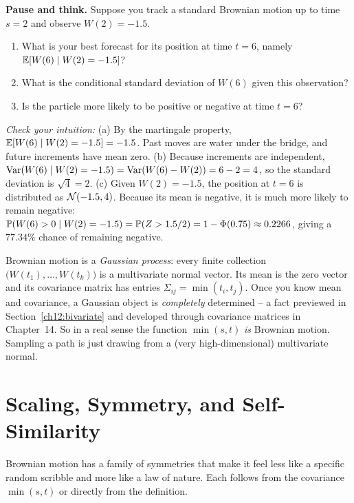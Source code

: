 \begin{recoverybox}
\textbf{Pause and think.} Suppose you track a standard Brownian motion up to time
$s=2$ and observe $W(2) = -1.5$.
\begin{enumerate}[label=(\alph*)]
  \item What is your best forecast for its position at time $t=6$, namely
  $\E[W(6) \mid W(2) = -1.5]$?
  \item What is the conditional standard deviation of $W(6)$ given this observation?
  \item Is the particle more likely to be positive or negative at time $t=6$?
\end{enumerate}
\textit{Check your intuition:}
(a) By the martingale property, $\E[W(6) \mid W(2) = -1.5] = -1.5$. Past moves are
water under the bridge, and future increments have mean zero.
(b) Because increments are independent,
$\Var(W(6) \mid W(2) = -1.5) = \Var(W(6)-W(2)) = 6 - 2 = 4$, so the standard
deviation is $\sqrt{4} = 2$.
(c) Given $W(2) = -1.5$, the position at $t=6$ is distributed as
$\Normal(-1.5, 4)$. Because its mean is negative, it is much more likely to remain
negative: $\P(W(6) > 0 \mid W(2)=-1.5) = \P(Z > 1.5/2) = 1 - \Phi(0.75) \approx 0.2266$,
giving a $77.34\%$ chance of remaining negative.
\end{recoverybox}

\begin{connectionbox}
Brownian motion is a \emph{Gaussian process}: every finite collection
$\big(W(t_1),\dots,W(t_k)\big)$ is a multivariate normal vector. Its mean is the
zero vector and its covariance matrix has entries $\Sigma_{ij}=\min(t_i,t_j)$.
Once you know mean and covariance, a Gaussian object is \emph{completely}
determined -- a fact previewed in Section~\ref{ch12:bivariate} and developed through
covariance matrices in Chapter~14. So in a real sense
the function $\min(s,t)$ \emph{is} Brownian motion. Sampling a path is just
drawing from a (very high-dimensional) multivariate normal.
\end{connectionbox}

\section{Scaling, Symmetry, and Self-Similarity}
\label{ch29:scaling}

Brownian motion has a family of symmetries that make it feel less like a specific
random scribble and more like a law of nature. Each follows from the covariance
$\min(s,t)$ or directly from the definition.

